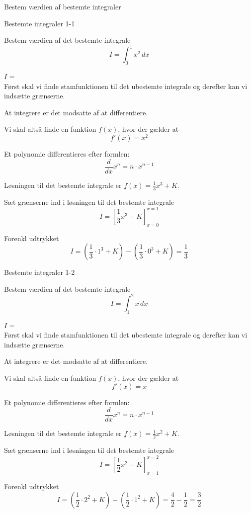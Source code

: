 \documentclass{article}
\begin{document}
Bestem værdien af bestemte integraler
\tableofcontents

\begin{exercise}{Bestemte integraler 1-1}

Bestem værdien af det bestemte integrale
\[
I = \int_0^1 x^2 \, dx
\]

$I$ =  \\


\hint
Først skal vi finde stamfunktionen til det ubestemte integrale og derefter kan vi indsætte grænserne.

\hint
At integrere er det modsatte af at differentiere.

\hint
Vi skal altså finde en funktion $f(x)$, hvor der gælder at
\[
f'(x) = x^2
\]

\hint
Et polynomie differentieres efter formlen:
\[
\frac{d}{dx} x^n = n \cdot x^{n - 1}
\]

\hint
Løsningen til det bestemte integrale er $f(x) = \frac{1}{3} x^3 + K$.

\hint
Sæt grænserne ind i løsningen til det bestemte integrale
\[
I = \left[ \frac{1}{3} x^3 + K \right]_{x=0}^{x=1}
\]

\hint
Forenkl udtrykket
\[
I = \left( \frac{1}{3} \cdot 1^3 + K \right) - \left( \frac{1}{3} \cdot 0^3 + K \right) = \frac{1}{3}
\]


\end{exercise}

\newpage

\begin{exercise}{Bestemte integraler 1-2}
	
	Bestem værdien af det bestemte integrale
	\[
	I = \int_1^2 x \, dx
	\]
	
	$I$ =  \\
	
	
	\hint
	Først skal vi finde stamfunktionen til det ubestemte integrale og derefter kan vi indsætte grænserne.
	
	\hint
	At integrere er det modsatte af at differentiere.
	
	\hint
	Vi skal altså finde en funktion $f(x)$, hvor der gælder at
	\[
	f'(x) = x
	\]
	
	\hint
	Et polynomie differentieres efter formlen:
	\[
	\frac{d}{dx} x^n = n \cdot x^{n - 1}
	\]
	
	\hint
	Løsningen til det bestemte integrale er $f(x) = \frac{1}{2} x^2 + K$.
	
	\hint
	Sæt grænserne ind i løsningen til det bestemte integrale
	\[
	I = \left[ \frac{1}{2} x^2 + K \right]_{x=1}^{x=2}
	\]
	
	\hint
	Forenkl udtrykket
	\[
	I = \left( \frac{1}{2} \cdot 2^2 + K \right) - \left( \frac{1}{2} \cdot 1^2 + K \right) = \frac{4}{2} - \frac{1}{2}=  \frac{3}{2}
	\]

	
\end{exercise}
\end{document}
